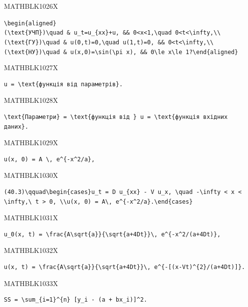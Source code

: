 \documentclass[
  ukrainian,
]{article}
\begin{document}
MATHBLK1026X

\texttt{\textbackslash{}begin\{aligned\}(\textbackslash{}text\{УЧП\})\textbackslash{}quad\ \&\ u\_t=u\_\{xx\}+u,\ \&\&\ 0\textless{}x\textless{}1,\textbackslash{}quad\ 0\textless{}t\textless{}\textbackslash{}infty,\textbackslash{}\textbackslash{}(\textbackslash{}text\{ГУ\})\textbackslash{}quad\ \&\ u(0,t)=0,\textbackslash{}quad\ u(1,t)=0,\ \&\&\ 0\textless{}t\textless{}\textbackslash{}infty,\textbackslash{}\textbackslash{}(\textbackslash{}text\{НУ\})\textbackslash{}quad\ \&\ u(x,0)=\textbackslash{}sin(\textbackslash{}pi\ x),\ \&\&\ 0\textbackslash{}le\ x\textbackslash{}le\ 1?\textbackslash{}end\{aligned\}}

MATHBLK1027X

\begin{verbatim}
u = \text{функція від параметрів}.
\end{verbatim}

MATHBLK1028X

\begin{verbatim}
\text{Параметри} = \text{функція від } u = \text{функція вхідних даних}.
\end{verbatim}

MATHBLK1029X

\begin{verbatim}
u(x, 0) = A \, e^{-x^2/a},
\end{verbatim}

MATHBLK1030X

\begin{verbatim}
(40.3)\qquad\begin{cases}u_t = D u_{xx} - V u_x, \quad -\infty < x < \infty,\ t > 0, \\u(x, 0) = A\, e^{-x^2/a}.\end{cases}
\end{verbatim}

MATHBLK1031X

\begin{verbatim}
u_0(x, t) = \frac{A\sqrt{a}}{\sqrt{a+4Dt}}\, e^{-x^2/(a+4Dt)},
\end{verbatim}

MATHBLK1032X

\begin{verbatim}
u(x, t) = \frac{A\sqrt{a}}{\sqrt{a+4Dt}}\, e^{-[(x-Vt)^{2}/(a+4Dt)]}.
\end{verbatim}

MATHBLK1033X

\begin{verbatim}
SS = \sum_{i=1}^{n} [y_i - (a + bx_i)]^2.
\end{verbatim}
\end{document}
